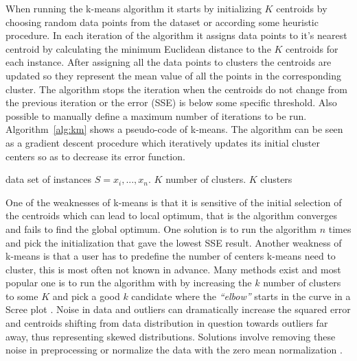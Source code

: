 When running the k-means algorithm it starts by initializing $K$ centroids by choosing random data points from the dataset or according some heuristic procedure. In each iteration of the algorithm it assigns data points to it's nearest centroid by calculating the minimum Euclidean distance to the $K$ centroids for each instance. After assigning all the data points to clusters the centroids are updated so they represent the mean value of all the points in the corresponding cluster. The algorithm stops the iteration when the centroids do not change from the previous iteration or the error (SSE) is below some specific threshold. Also possible to manually define a maximum number of iterations to be run. Algorithm~\ref{alg:km} shows a pseudo-code of k-means. The algorithm can be seen as a gradient descent procedure which iteratively updates its initial cluster centers so as to decrease its error function.
\begin{center}
\newcommand{\km}{\ensuremath{\mbox{\sc K-means}}}
\begin{algorithm}[h!]
\caption{$\km(S,K)$}\label{alg:km}
\begin{algorithmic}[1]
\REQUIRE data set of instances $S = {x_i,...,x_n}$. $K$ number of clusters.  
\ENSURE $K$ clusters
\medskip
{}

\ENDWHILE
\end{algorithmic}
\end{algorithm}
\end{center}
One of the weaknesses of k-means is that it is sensitive of the initial selection of the centroids which can lead to local optimum, that is the algorithm converges and fails to find the global optimum. One solution is to run the algorithm $n$ times and pick the initialization that gave the lowest SSE result. Another weakness of k-means is that a user has to predefine the number of centers k-means need to cluster, this is most often not known in advance. Many methods exist and most popular one is to run the algorithm with by increasing the $k$ number of clusters to some $K$ and pick a good $k$ candidate where the \textit{``elbow''} starts in the curve in a Scree plot \citep{Han:2006DM}. Noise in data and outliers can dramatically increase the squared error and centroids shifting from data distribution in question towards outliers far away, thus representing skewed distributions. Solutions involve removing these noise in preprocessing or normalize the data with the zero mean normalization \citep{Xu:2005Clustering, Han:2006DM}.

